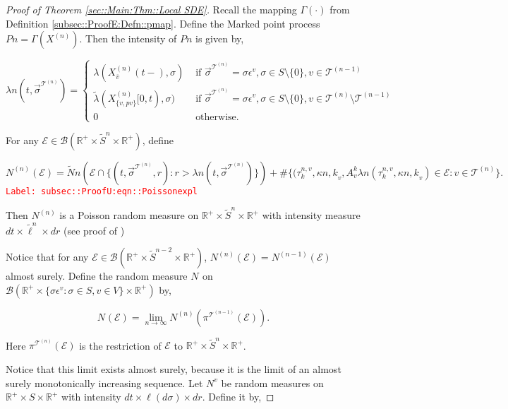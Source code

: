 \documentclass[12pt]{article}
\newcommand{\mb}{\mathbb}
\newcommand{\mc}{\mathcal}
\newcommand{\ms}{\mathscr}
\newcommand{\ra}{\rightarrow}
\newcommand{\ov}{\overline}
\newcommand{\te}{\text}
\newcommand{\ep}{\epsilon}
\newcommand{\tr}{\textcolor{red}}
\newcommand{\labe}[1]{\tr{\texttt{Label: #1}}}
\newcommand{\ind}{\hspace{24pt}}
\renewcommand{\v}{v}							%
\renewcommand{\S}{S}							%
\newcommand{\s}{\sigma}							%
\newcommand{\sv}{\vec{\s}}						%
\newcommand{\ev}{\ep}							%
\renewcommand{\t}{t}							%
\newcommand{\proj}{\pi}							%
\newcommand{\X}{X}								%
\newcommand{\vind}[1]{^{#1}}					%
\newcommand{\vsi}[1]{^{#1}}						%
\newcommand{\cind}[1]{_{#1}}					%
\newcommand{\cl}{\ov}							%
\newcommand{\tp}[1]{(#1)}						%
\newcommand{\tip}[1]{#1}						%
\newcommand{\ts}[1]{_{#1}}						%
\newcommand{\slnvind}[2]{^{#1,#2}}				%
\newcommand{\tree}{\mc{T}}						%
\newcommand{\sln}[1]{^{(#1)}}					%
\newcommand{\poiss}{N}							%
\newcommand{\Sm}{\ell}							%
\newcommand{\rate}{\lambda}						%
\renewcommand{\r}{r}							%
\newcommand{\alt}[1]{\widetilde{#1}}			%
\newcommand{\indx}[1]{_{#1}}					%
\newcommand{\rt}{\tau}							%
\renewcommand{\it}{k}							%
\newcommand{\evnt}{\mc{E}}						%
\newcommand{\rv}{A}								%
\newcommand{\pmap}{\Gamma}						%
\renewcommand{\mark}{\kappa}					%
\newcommand{\rp}{P}								%
\newcommand{\crate}{\alt{\lambda}}				%
\newcommand{\p}{p}								%
\begin{document}
\begin{proof}[Proof of Theorem \ref{sec::Main:Thm::Local SDE}]
\ind Recall the mapping \(\pmap{}(\cdot)\) from Definition \ref{subsec::ProofE:Defn::pmap}. Define the Marked point process \(\rp{n} = \pmap{}(\X\sln{n}\cind{}\tip{})\). Then the intensity of \(\rp{n}\) is given by,

\[\rate{n}(\t,\sv\cind{}\vsi{\tree\sln{n}}) = \begin{cases}
\rate{}(\X\sln{n}\cind{\cl{\v}}\tp{\t-},\s) &\te{ if } \sv\cind{}\vsi{\tree\sln{n}} = \s\ev\vind{\v},\s \in \S\setminus\{0\},\v\in\tree\sln{n-1}\\
\crate{}{}(\X\sln{n}\cind{\{\v,\p{\v}\}}\tip{[0,\t)},\s) &\te{ if } \sv\cind{}\vsi{\tree\sln{n}} = \s\ev\vind{\v},\s\in\S\setminus\{0\},\v\in\tree\sln{n}\setminus\tree\sln{n-1}\\
0 &\te{ otherwise.}
\end{cases}\]

For any \(\evnt{} \in \ms{B}(\mb{R}^+\times\alt{\S}^n\times\mb{R}^+)\), define

\begin{equation}
\poiss\sln{n}(\evnt{}) = \alt{\poiss}{n}\left(\evnt{}\cap\{(\t,\sv\cind{}\vsi{\tree\sln{n}},\r):\r > \rate{n}(\t,\sv\cind{}\vsi{\tree\sln{n}})\}\right) + \#\{(\rt\slnvind{n}{\v}\indx{\it},\mark{n,\it}_\v,\rv_{\v}^{\it}\rate{n}(\rt\slnvind{n}{\v}\indx{\it},\mark{n,\it}_\v) \in \evnt{}: \v\in \tree\sln{n}\}.
\label{subsec::ProofU:eqn::Poissonexpl}
\end{equation}
\labe{subsec::ProofU:eqn::Poissonexpl}

Then \(\poiss\sln{n}\) is a Poisson random measure on \(\mb{R}^+\times\alt{\S}^n\times \mb{R}^+\) with intensity measure \(d\t\times \alt{\Sm}^n\times d\r\) (see proof of \cite[Theorem 14.7.1(b)]{DalVer08})

\ind Notice that for any \(\evnt{} \in \ms{B}(\mb{R}^+\times \alt{\S}^{n-2}\times \mb{R}^+)\), \(\poiss\sln{n}(\evnt{}) = \poiss\sln{n-1}(\evnt{})\) almost surely. Define the random measure \(\poiss\vind{}\) on \(\ms{B}(\mb{R}^+\times \{\s\ev\vind{\v}:\s\in \S,\v \in V\}\times \mb{R}^+)\) by,

\[\poiss\vind{}(\evnt{}) = \lim_{n \ra\infty}\poiss\sln{n}\left(\proj\vsi{\tree\sln{n-1}}\ts{}(\evnt{})\right).\]

Here \(\proj\vsi{\tree\sln{n}}\ts{}(\evnt{})\) is the restriction of \(\evnt{}\) to \(\mb{R}^+\times \alt{\S}^n\times\mb{R}^+\). 

\ind Notice that this limit exists almost surely, because it is the limit of an almost surely monotonically increasing sequence. Let \(\poiss\vind{\v}\) be random measures on \(\mb{R}^+\times\S\times\mb{R}^+\) with intensity \(d\t\times\Sm(d\s)\times d\r\). Define it by,


\end{proof}
\end{document}

